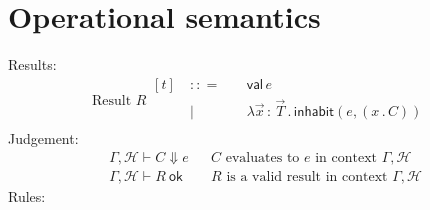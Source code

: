 \documentclass{article}
\newcommand{\bnf}{\ \mathrel{{:}{:}{=}}\ }
\newcommand{\bnfor}{\ \mid\ \ }
\newcommand{\x}{x}     %
\newcommand{\C}{C}     %
\newcommand{\e}{e}     %
\newcommand{\T}{T}     %
\newcommand{\val}{\mathsf{val}\,} %
\newcommand{\inhabit}[2]{\mathsf{inhabit}(#1, #2)} %
\newcommand{\cont}[2]{(#1 \,.\, #2)} %
\newcommand{\lam}[2]{\lambda #1 \,{:}\, #2 \,.\,} %
\newcommand{\G}{\Gamma}
\renewcommand{\H}{\mathcal{H}} %
\newcommand{\GH}{\G, \H} %
\newcommand{\evalto}[3][\GH]{#1 \vdash #2 \Downarrow #3}
\newcommand{\resultok}[2][\GH]{#1 \vdash #2 \ \mathsf{ok}}
\begin{document}
\section{Operational semantics}
\label{sec:oper-semant}

Results:
%
\begin{equation*}
  \text{Result $R$}
  \begin{aligned}[t]
    &\bnf   {} && \val \e \\
    &\bnfor {} && \lam{\vec{x}}{\vec{\T}} \inhabit{\e}{\cont{\x}{\C}} \\
  \end{aligned}  
\end{equation*}
%
Judgement:
%
\begin{align*}
  &\evalto[\GH]{C}{e} &&\text{$C$ evaluates to $e$ in context $\GH$} \\
  &\resultok[\GH]{R}  &&\text{$R$ is a valid result in context $\GH$}
\end{align*}
%
Rules:
\end{document}
